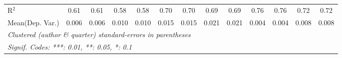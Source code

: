 \begin{tabular}{lcccccccccccc}
   R$^2$                                    & 0.61          & 0.61          & 0.58    & 0.58          & 0.70        & 0.70          & 0.69    & 0.69          & 0.76     & 0.76     & 0.72    & 0.72\\  
Mean(Dep. Var.) & 0.006 & 0.006 & 0.010 & 0.010 & 0.015 & 0.015 & 0.021 & 0.021 & 0.004 & 0.004 & 0.008 & 0.008 \\
   \midrule \midrule
   \multicolumn{13}{l}{\emph{Clustered (author \& quarter) standard-errors in parentheses}}\\
   \multicolumn{13}{l}{\emph{Signif. Codes: ***: 0.01, **: 0.05, *: 0.1}}\\
\end{tabular}
\par\endgroup
